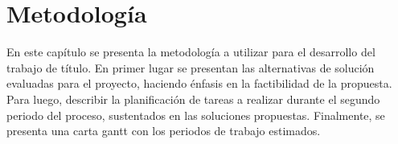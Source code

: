 
\chapter{Metodología}\label{chapter:metodologia}

En este capítulo se presenta la metodología a utilizar para el desarrollo del trabajo de título. En primer lugar se presentan las alternativas de solución evaluadas para el proyecto, haciendo énfasis en la factibilidad de la propuesta. Para luego, describir la planificación de tareas a realizar durante el segundo periodo del proceso, sustentados en las soluciones propuestas. Finalmente, se presenta una carta gantt con los periodos de trabajo estimados.


%
%
%

%
%
%
%
%


